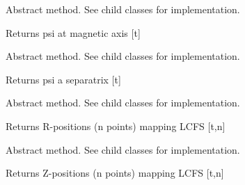 \documentclass[letterpaper,10pt,english]{sphinxmanual}
\begin{document}
\begin{fulllineitems}

\begin{fulllineitems}
\label{\detokenize{eqtools:eqtools.core.Equilibrium.getFluxAxis}}
Abstract method.  See child classes for implementation.

Returns psi at magnetic axis {[}t{]}

\end{fulllineitems}


\begin{fulllineitems}
\label{\detokenize{eqtools:eqtools.core.Equilibrium.getFluxLCFS}}
Abstract method.  See child classes for implementation.

Returns psi a separatrix {[}t{]}

\end{fulllineitems}


\begin{fulllineitems}
\label{\detokenize{eqtools:eqtools.core.Equilibrium.getRLCFS}}
Abstract method.  See child classes for implementation.

Returns R-positions (n points) mapping LCFS {[}t,n{]}

\end{fulllineitems}


\begin{fulllineitems}
\label{\detokenize{eqtools:eqtools.core.Equilibrium.getZLCFS}}
Abstract method.  See child classes for implementation.

Returns Z-positions (n points) mapping LCFS {[}t,n{]}

\end{fulllineitems}


\end{fulllineitems}
\end{document}
